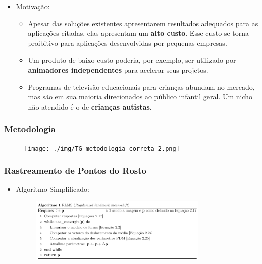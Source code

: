 \documentclass[brazil]{beamer}
\begin{document}
\begin{frame}
  \begin{itemize}
      \item Motivação:
      
      \begin{itemize}
      
        \item Apesar das soluções existentes apresentarem resultados adequados para as aplicações citadas, elas apresentam um \textbf{alto custo}. Esse custo se torna proibitivo para aplicações desenvolvidas por pequenas empresas.
        
        \item Um produto de baixo custo poderia, por exemplo, ser utilizado por \textbf{animadores independentes} para acelerar seus projetos.
        
        \item Programas de televisão educacionais para crianças abundam no mercado, mas são em sua maioria direcionados ao público infantil geral. Um nicho não atendido é o de
\textbf{crianças autistas}.
        
      \end{itemize}   
          
  \end{itemize} 

\end{frame}

\begin{frame}
	\frametitle{Metodologia}
      \begin{figure}
        \centering
        \texttt{[image: ./img/TG-metodologia-correta-2.png]}
      \end{figure}   
          
\end{frame}

\begin{frame}
\frametitle{Rastreamento de Pontos do Rosto}
  \begin{itemize}
      \item Algoritmo Simplificado:   
          \begin{figure}
        \centering
        \includegraphics[width = 0.8\textwidth, keepaspectratio]{./img/algorithm.png}
      \end{figure}
  \end{itemize} 
\end{frame}
\end{document}

